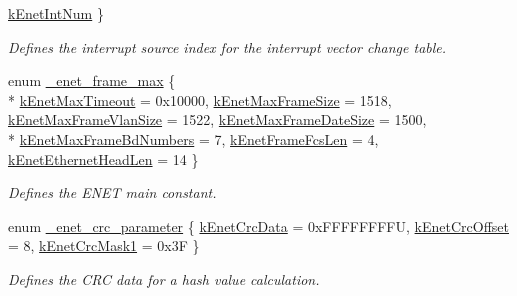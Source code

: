 \begin{DoxyCompactItemize}
\hyperlink{group__enet__driver_gga5e436b0f66c91117426a2bf7d0cad7aeaff02672771d7fe5ca1264a2f37d9f6a7}{k\+Enet\+Int\+Num}
 \}\begin{DoxyCompactList}\small\item\em Defines the interrupt source index for the interrupt vector change table. \end{DoxyCompactList}
\item 
enum \hyperlink{group__enet__driver_ga9f232f6ffcec5c632ffbdb26312d2925}{\+\_\+enet\+\_\+frame\+\_\+max} \{ \\*
\hyperlink{group__enet__driver_gga9f232f6ffcec5c632ffbdb26312d2925a9a187f4e111225ca14bb55bff4815811}{k\+Enet\+Max\+Timeout} = 0x10000, 
\hyperlink{group__enet__driver_gga9f232f6ffcec5c632ffbdb26312d2925af383e7bd05019bc27865dd15eed5e213}{k\+Enet\+Max\+Frame\+Size} = 1518, 
\hyperlink{group__enet__driver_gga9f232f6ffcec5c632ffbdb26312d2925ab3c73c6a827f9d6eec390f1bdd8479bf}{k\+Enet\+Max\+Frame\+Vlan\+Size} = 1522, 
\hyperlink{group__enet__driver_gga9f232f6ffcec5c632ffbdb26312d2925a87c3bc176281c7da2224e0b0bf20fe38}{k\+Enet\+Max\+Frame\+Date\+Size} = 1500, 
\\*
\hyperlink{group__enet__driver_gga9f232f6ffcec5c632ffbdb26312d2925a2ceebde5de66829971ef3928be0a51f3}{k\+Enet\+Max\+Frame\+Bd\+Numbers} = 7, 
\hyperlink{group__enet__driver_gga9f232f6ffcec5c632ffbdb26312d2925a17253e9ee760d2845c488b289a96422f}{k\+Enet\+Frame\+Fcs\+Len} = 4, 
\hyperlink{group__enet__driver_gga9f232f6ffcec5c632ffbdb26312d2925aef03975d9867b3d0fa39a588eb649d67}{k\+Enet\+Ethernet\+Head\+Len} = 14
 \}\begin{DoxyCompactList}\small\item\em Defines the E\+N\+ET main constant. \end{DoxyCompactList}
\item 
enum \hyperlink{group__enet__driver_ga105b06cb7053167fbb1b5cf300cb88f1}{\+\_\+enet\+\_\+crc\+\_\+parameter} \{ \hyperlink{group__enet__driver_gga105b06cb7053167fbb1b5cf300cb88f1aa160df8b590b7a13dbf051ca16959e41}{k\+Enet\+Crc\+Data} = 0x\+F\+F\+F\+F\+F\+F\+F\+FU, 
\hyperlink{group__enet__driver_gga105b06cb7053167fbb1b5cf300cb88f1aa31ca173ee4907b959fa5bcb94ea6839}{k\+Enet\+Crc\+Offset} = 8, 
\hyperlink{group__enet__driver_gga105b06cb7053167fbb1b5cf300cb88f1adfdfb3545f26c29f0730fb878dcedc8e}{k\+Enet\+Crc\+Mask1} = 0x3F
 \}\begin{DoxyCompactList}\small\item\em Defines the C\+RC data for a hash value calculation. \end{DoxyCompactList}

\end{DoxyCompactItemize}
